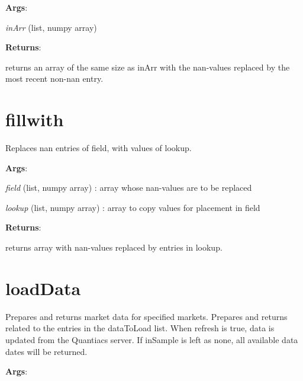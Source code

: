 \documentclass[letterpaper,10pt,english]{sphinxmanual}
\begin{document}
\textbf{Args}:

\emph{inArr} (list, numpy array)

\textbf{Returns}:

returns an array of the same size as inArr with the nan-values replaced by the most recent non-nan entry.


\section{fillwith}
\label{reference:fillwith}

\begin{fulllineitems}
\label{reference:quantiacsToolbox.fillwith}
\end{fulllineitems}


Replaces nan entries of field, with values of lookup.

\textbf{Args}:

\emph{field} (list, numpy array) : array whose nan-values are to be replaced

\emph{lookup} (list, numpy array) : array to copy values for placement in field

\textbf{Returns}:

returns array with nan-values replaced by entries in lookup.


\section{loadData}
\label{reference:loaddata}

\begin{fulllineitems}
\label{reference:quantiacsToolbox.loadData}
\end{fulllineitems}


Prepares and returns market data for specified markets. Prepares and returns related to the entries in the dataToLoad list. When refresh is true, data is updated from the Quantiacs server. If inSample is left as none, all available data dates will be returned.

\textbf{Args}:
\end{document}
